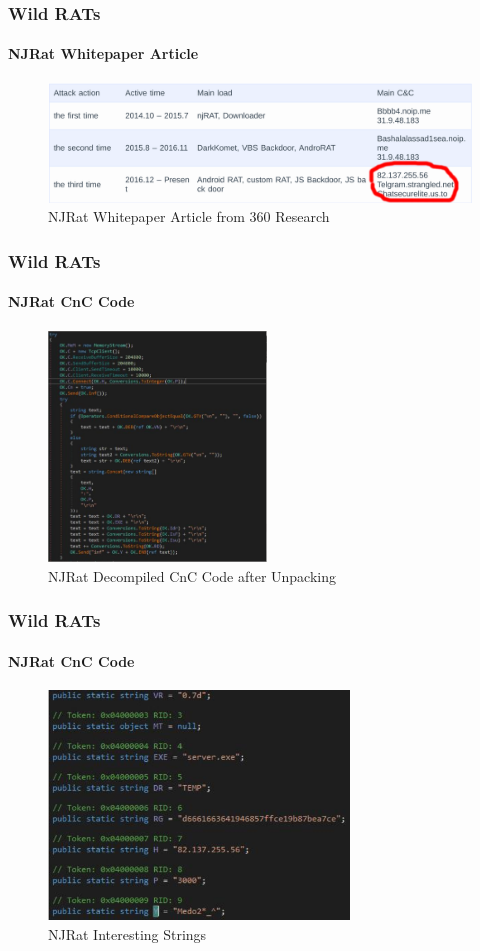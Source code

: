 \documentclass[aspectratio=169]{beamer}
\begin{document}
\begin{frame}
  \frametitle{Wild RATs}
  \framesubtitle{NJRat Whitepaper Article}
  \begin{center}
    \begin{figure}
      \includegraphics[width=12cm,keepaspectratio]{njrat_article}
      \caption{NJRat Whitepaper Article from 360 Research}
    \end{figure}
  \end{center}
\end{frame}

\begin{frame}
  \frametitle{Wild RATs}
  \framesubtitle{NJRat CnC Code}
  \begin{center}
    \begin{figure}
      \includegraphics[width=5.8cm,keepaspectratio]{njrat_cnc}
      \caption{NJRat Decompiled CnC Code after Unpacking}
    \end{figure}
  \end{center}
\end{frame}

\begin{frame}
  \frametitle{Wild RATs}
  \framesubtitle{NJRat CnC Code}
  \begin{center}
    \begin{figure}
      \includegraphics[width=8cm,keepaspectratio]{njrat_strings}
      \caption{NJRat Interesting Strings}
    \end{figure}
  \end{center}
\end{frame}
\end{document}
